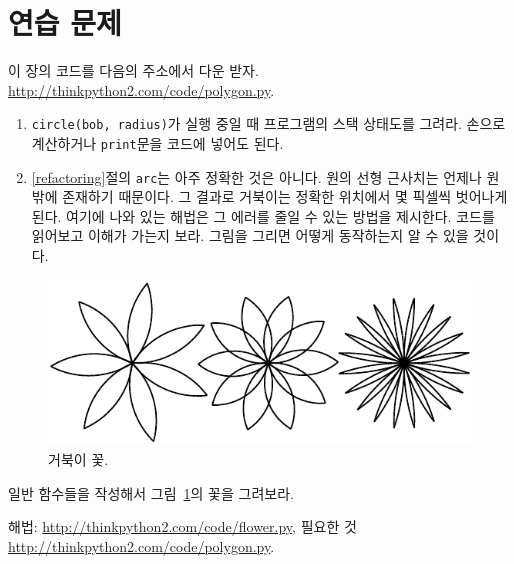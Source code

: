 \documentclass[10pt]{book}
\begin{document}
\section{연습 문제}

\begin{exercise}

이 장의 코드를 다음의 주소에서 다운 받자.
\url{http://thinkpython2.com/code/polygon.py}.

\begin{enumerate}

\item {\tt circle(bob, radius)}가 실행 중일 때 프로그램의 스택 상태도를
  그려라.  손으로 계산하거나 {\tt print}문을 코드에 넣어도 된다.

\item \ref{refactoring}절의 {\tt arc}는 아주 정확한 것은 아니다.  원의
  선형 근사치는 언제나 원 밖에 존재하기 때문이다.  그 결과로 거북이는
  정확한 위치에서 몇 픽셀씩 벗어나게 된다.  여기에 나와 있는 해법은 그
  에러를 줄일 수 있는 방법을 제시한다.  코드를 읽어보고 이해가 가는지
  보라.  그림을 그리면 어떻게 동작하는지 알 수 있을 것이다.

\end{enumerate}

\end{exercise}

\begin{figure}
\centerline
{\includegraphics[scale=0.8]{figs/flowers.pdf}}
\caption{거북이 꽃.}
\label{fig.flowers}
\end{figure}

\begin{exercise}

일반 함수들을 작성해서 그림~\ref{fig.flowers}의 꽃을 그려보라.


해법: \url{http://thinkpython2.com/code/flower.py},
필요한 것 \url{http://thinkpython2.com/code/polygon.py}.

\end{exercise}
\end{document}
